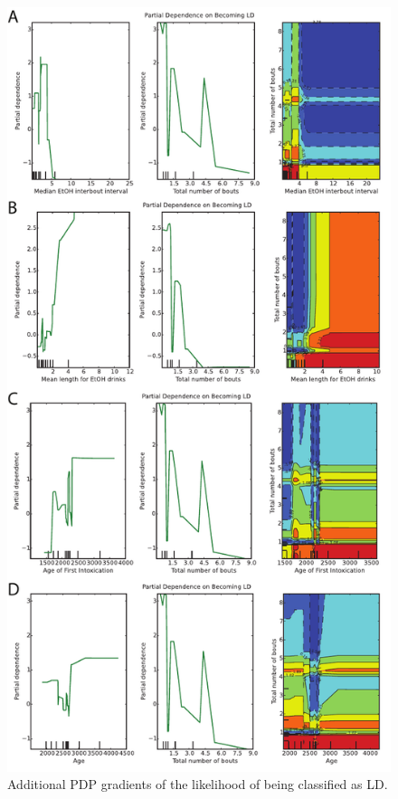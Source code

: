 \begin{figure}[ht]
\centering
\includegraphics[width=0.7\linewidth]{figures/pdp_ld.pdf}
\caption{Additional PDP gradients of the likelihood of being classified as LD.}
\label{fig:LD_gradients}
\end{figure}
